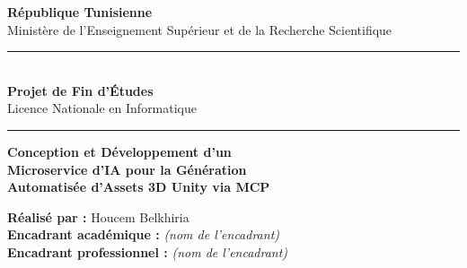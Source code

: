 \documentclass[12pt,a4paper,oneside]{report}
\begin{document}
\begin{titlepage}
\centering

{\large \textbf{République Tunisienne}\\
Ministère de l'Enseignement Supérieur et de la Recherche Scientifique}\\[0.4cm]


\vspace{0.6cm}
\rule{\linewidth}{1pt}\\[0.2cm]
{\LARGE \textbf{Projet de Fin d'Études}}\\[0.1cm]
{\large Licence Nationale en Informatique}\\[0.1cm]
\rule{\linewidth}{1pt}

\vspace{0.5cm}

{\color{tekupblue}\Huge\bfseries
Conception et Développement d'un\\[0.2cm]
Microservice d'IA pour la Génération\\[0.2cm]
Automatisée d'Assets 3D Unity via MCP
}

\vspace{0.4cm}

\vspace{0.6cm}
\begin{mdframed}[linecolor=tekupblue, linewidth=1pt,
                  leftmargin=30pt, rightmargin=30pt]
\centering
\textbf{Réalisé par :} Houcem Belkhiria\\[0.3cm]
\textbf{Encadrant académique :} \textit{(nom de l'encadrant)}\\[0.1cm]
\textbf{Encadrant professionnel :} \textit{(nom de l'encadrant)}
\end{mdframed}


\end{titlepage}
\end{document}
